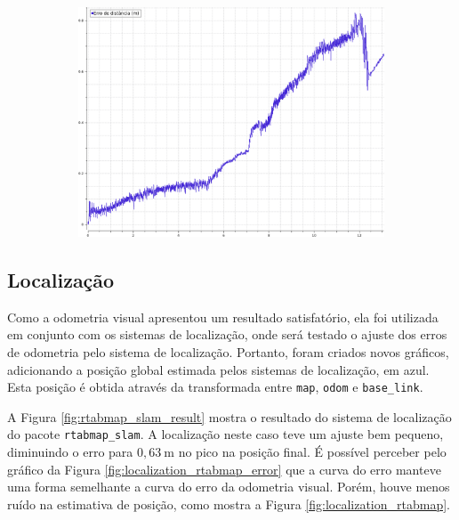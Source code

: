 \documentclass[repeatfields,xlists,xpacks,oneside,yearsonly]{ufrgscca}
\begin{document}
\begin{figure}[h]
\begin{subfigure}{0.5\linewidth}
{            \includegraphics[width=0.98\linewidth]{odom-visual-error.png}\\
        }
    \end{subfigure}
\end{figure}

\subsection{Localização}

Como a odometria visual apresentou um resultado satisfatório, ela foi
utilizada em conjunto com os sistemas de localização, onde será
testado o ajuste dos erros de odometria pelo sistema de localização.
Portanto, foram criados novos gráficos, adicionando a posição global
estimada pelos sistemas de localização, em azul. Esta posição é
obtida através da transformada entre \texttt{map}, \texttt{odom} e
\texttt{base\_link}.

A Figura \ref{fig:rtabmap_slam_result} mostra o resultado do sistema
de localização do pacote \texttt{rtabmap\_slam}. A localização neste
caso teve um ajuste bem pequeno, diminuindo o erro para
$0,63~\si{\meter}$ no pico na posição final. É possível perceber pelo
gráfico da Figura \ref{fig:localization_rtabmap_error} que a curva do
erro manteve uma forma semelhante a curva do erro da odometria
visual. Porém, houve menos ruído na estimativa de posição, como
mostra a Figura \ref{fig:localization_rtabmap}.
\end{document}
